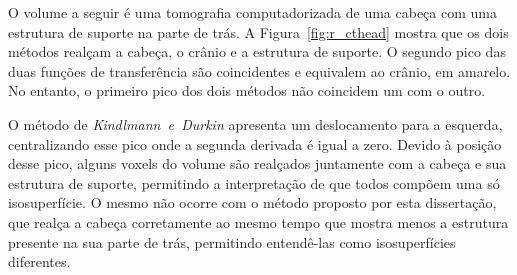 %
\newpage
	O volume a seguir é uma tomografia computadorizada de uma cabeça com uma estrutura de suporte na parte de trás. A Figura~\ref{fig:r_cthead} mostra que os dois métodos realçam a cabeça, o crânio e a estrutura de suporte. O segundo pico das duas funções de transferência são coincidentes e equivalem ao crânio, em amarelo. No entanto, o primeiro pico dos dois métodos não coincidem um com o outro.
	
	O método de \textit{Kindlmann~e~Durkin} apresenta um deslocamento para a esquerda, centralizando esse pico onde a segunda derivada é igual a zero. Devido à posição desse pico, alguns voxels do volume são realçados juntamente com a cabeça e sua estrutura de suporte, permitindo a interpretação de que todos compõem uma só isosuperfície. O mesmo não ocorre com o método proposto por esta dissertação, que realça a cabeça corretamente ao mesmo tempo que mostra menos a estrutura presente na sua parte de trás, permitindo entendê-las como isosuperfícies diferentes.

